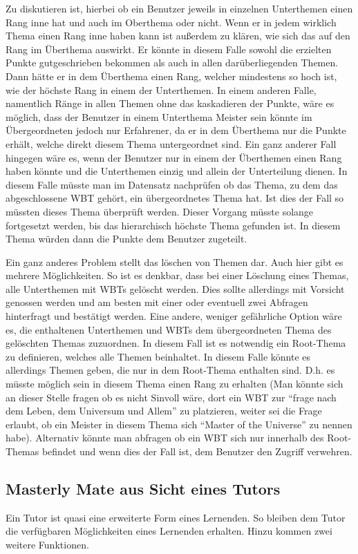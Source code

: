 Zu diskutieren ist, hierbei ob ein Benutzer jeweils in einzelnen Unterthemen
einen Rang inne hat und auch im Oberthema oder nicht. Wenn er in jedem wirklich
Thema einen Rang inne haben kann ist außerdem zu klären, wie sich das auf den
Rang im Überthema auswirkt. Er könnte in diesem Falle sowohl die erzielten
Punkte gutgeschrieben bekommen als auch in allen darüberliegenden Themen. Dann
hätte er in dem Überthema einen Rang, welcher mindestens so hoch ist, wie der
höchste Rang in einem der Unterthemen. 
In einem anderen Falle, namentlich Ränge in allen Themen ohne das kaskadieren
der Punkte, wäre es möglich, dass der Benutzer in einem Unterthema Meister sein
könnte im Übergeordneten jedoch nur Erfahrener, da er in dem Überthema nur die
Punkte erhält, welche direkt diesem Thema untergeordnet sind.
Ein ganz anderer Fall hingegen wäre es, wenn der Benutzer nur in einem der
Überthemen einen Rang haben könnte und die Unterthemen einzig und allein der
Unterteilung dienen. In diesem Falle müsste man im Datensatz nachprüfen ob das
Thema, zu dem das abgeschlossene WBT gehört, ein übergeordnetes Thema hat. Ist
dies der Fall so müssten dieses Thema überprüft werden. Dieser Vorgang müsste
solange fortgesetzt werden, bis das hierarchisch höchste Thema gefunden ist.
In diesem Thema würden dann die Punkte dem Benutzer zugeteilt.

Ein ganz anderes Problem stellt das löschen von Themen dar. Auch hier gibt es
mehrere Möglichkeiten. So ist es denkbar, dass bei einer Löschung eines Themas,
alle Unterthemen mit WBTs gelöscht werden. Dies sollte allerdings mit Vorsicht
genossen werden und am besten mit einer oder eventuell zwei Abfragen hinterfragt
und bestätigt werden.
Eine andere, weniger gefährliche Option wäre es, die enthaltenen Unterthemen und
WBTs dem übergeordneten Thema des gelöschten Themas zuzuordnen. In diesem Fall
ist es notwendig ein Root-Thema zu definieren, welches alle Themen beinhaltet.
In diesem Falle könnte es allerdings Themen geben, die nur in dem Root-Thema
enthalten sind. D.h. es müsste möglich sein in diesem Thema einen Rang
zu erhalten (Man könnte sich an dieser Stelle fragen ob es nicht Sinvoll wäre,
dort ein WBT zur "`frage nach dem Leben, dem Universum und Allem"' zu
platzieren, weiter sei die Frage erlaubt, ob ein Meister in diesem Thema sich
``Master of the Universe'' zu nennen habe). Alternativ könnte man abfragen ob
ein WBT sich nur innerhalb des Root-Themas befindet und wenn dies der Fall ist,
dem Benutzer den Zugriff verwehren.  

\subsection{Masterly Mate aus Sicht eines Tutors}
Ein Tutor ist quasi eine erweiterte Form eines Lernenden. So bleiben dem Tutor
die verfügbaren Möglichkeiten eines Lernenden erhalten. Hinzu kommen zwei
weitere Funktionen.

